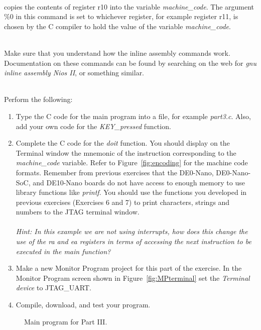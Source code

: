 \documentclass[epsfig,10pt,fullpage]{article}
\begin{document}
~\\
\noindent
copies the contents of register r10 into the variable {\it machine\_code}. The argument {\sf \%0}
in this command is set to whichever register, for example register r11, is chosen by the C
compiler to hold the value of the variable {\it machine\_code}.  

~\\
\noindent
Make sure that you understand how the inline assembly commands work. Documentation on
these commands can be found by searching on the web for {\it gnu inline assembly Nios II}, or
something similar.

~\\
\noindent
Perform the following:

\begin{enumerate}
\item
Type the C code for the main program into a file, for example {\it part3.c}. Also, add
your own code for the {\it KEY\_pressed} function.

\item 
Complete the C code for the {\it doit} function. You should display on the Terminal window
the mnemonic of the instruction corresponding to the {\it machine\_code} variable.
Refer to Figure~\ref{fig:encoding} for the machine code formats.
Remember from previous exercises that the DE0-Nano, DE0-Nano-SoC, and DE10-Nano boards do not have access
to enough memory to use library functions like {\it printf}. You should use the functions you 
developed in previous exercises (Exercises 6 and 7) to print characters, strings and numbers
to the JTAG terminal window.
\\\\
{\it Hint: In this example we are not using interrupts, how does this change the use of the 
{\sf ra} and {\sf ea} registers in terms of accessing the next instruction to be executed in the main function?}

\item
Make a new Monitor Program project for this part of the exercise. In the Monitor Program screen 
shown in Figure~\ref{fig:MPterminal} set the {\it Terminal device} to {\sf JTAG\_UART}.

\item
Compile, download, and test your program. 
\end{enumerate}

\begin{figure}[H]
\begin{center}

\end{center}
\caption{Main program for Part III.}
\label{fig:C_code1}
\end{figure}
\end{document}
